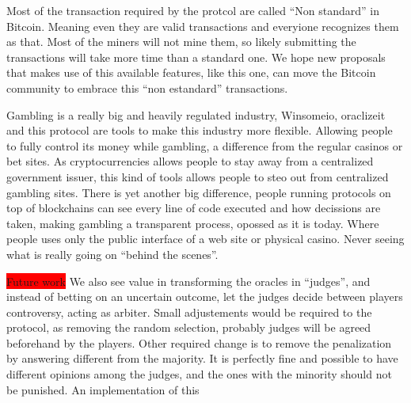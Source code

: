 Most of the transaction required by the protcol are called ``Non standard''
  in Bitcoin.
Meaning even they are valid transactions and everyione recognizes them as that.
Most of the miners will not mine them, so likely submitting the transactions
  will take more time than a standard one.
We hope new proposals that makes use of this available features, like this one,
  can move the Bitcoin community to embrace this ``non estandard'' transactions.

Gambling is a really big and heavily regulated industry, Winsomeio, oraclizeit
  and this protocol are tools  to make this industry more flexible.
Allowing people to fully control its money while gambling, a difference from
  the regular casinos or bet sites.
As cryptocurrencies allows people to stay away from a centralized government
  issuer, this kind of tools allows people to steo out from centralized gambling
  sites.
There is yet another big difference, people running protocols on top of
  blockchains can see every line of code executed and how decissions are taken,
  making gambling a transparent process, opossed as it is today.
Where people uses only the public interface of a web site or physical casino.
Never seeing what is really going on ``behind the scenes''.


\colorbox{red}{Future work}
We also see value in transforming the oracles in ``judges'', and instead of
  betting on an uncertain outcome, let the judges decide between players
  controversy, acting as arbiter.
Small adjustements would be required to the protocol, as removing the random
  selection, probably judges will be agreed beforehand by the players.
Other required change is to remove the penalization by answering different
  from the majority.
It is perfectly fine and possible to have different opinions among the
  judges, and the ones with the minority should not be punished.
An implementation of this

